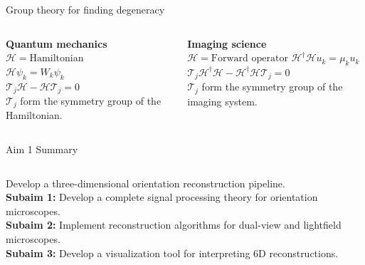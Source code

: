 \documentclass[presentation]{beamer}
\begin{document}
\begin{frame}[label=sec-1]{Group theory for finding degeneracy}
\begin{columns}
  \begin{column}{0.5\textwidth}
    \centering \textbf{Quantum mechanics}\\\vspace{2em}
    $\mathcal{H} = \text{Hamiltonian}$\\\vspace{2em}
    $\mathcal{H}\psi_k = W_k\psi_k$\\\vspace{2em}
    $\mathcal{T}_j\mathcal{H} - \mathcal{H}\mathcal{T}_j = 0$\\\vspace{2em}
    $\mathcal{T}_j$ form the symmetry group of the Hamiltonian.
\end{column}
\begin{column}{0.5\textwidth}  %
  \centering \textbf{Imaging science}\\\vspace{2em}
  $\mathcal{H} = \text{Forward operator}$\vspace{2em}
  $\mathcal{H}^{\dagger}\mathcal{H}u_k = \mu_ku_k$\\\vspace{2em}
  $\mathcal{T}_j\mathcal{H}^{\dagger}\mathcal{H} - \mathcal{H}^{\dagger}\mathcal{H}\mathcal{T}_j = 0$\\\vspace{2em}
  $\mathcal{T}_j$ form the symmetry group of the imaging system.
  \end{column}
\end{columns}
\end{frame}

\begin{frame}{Aim 1 Summary}
  \begin{columns}
    \begin{column}{0.75\textwidth}
    Develop a three-dimensional orientation reconstruction pipeline.\\ \vspace{1em}
    \textbf{Subaim 1:} 
    Develop a complete signal processing theory for orientation microscopes. \\ \vspace{1em}
    \textbf{Subaim 2:}
    Implement reconstruction algorithms for dual-view and lightfield microscopes.\\ \vspace{1em}
    \textbf{Subaim 3:}
    Develop a visualization tool for interpreting 6D reconstructions. 
    \end{column}
  \end{columns}
  \end{frame}
\end{document}
